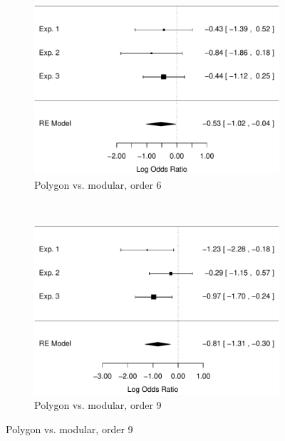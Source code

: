 \documentclass[man,mask,10pt]{apa6}
\begin{document}
\begin{figure}
\centering
\begin{subfigure}[c]{0.4\textwidth}
\centering
\includegraphics[width=\textwidth]{figures/meta/question_typeinverse_nonzero_6_conditionpolygon.pdf}
\caption{Polygon vs. modular, order 6}
\end{subfigure}
~
\begin{subfigure}[c]{0.4\textwidth}
\centering
\includegraphics[width=\textwidth]{figures/meta/question_typeinverse_nonzero_9_conditionpolygon.pdf}
\caption{Polygon vs. modular, order 9}


\end{subfigure}
\end{figure}
\end{document}
